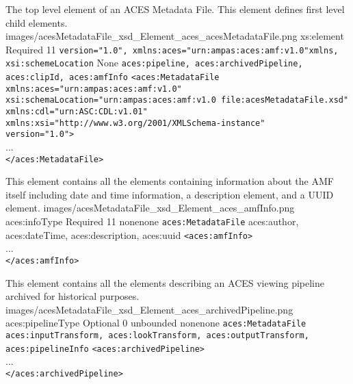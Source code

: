         {The top level element of an ACES Metadata File.  This element defines first level child elements.}
        {images/acesMetadataFile_xsd_Element_aces_acesMetadataFile.png}
        {xs:element}
        {Required}
        {1}{1}
        {\texttt{version="1.0", xmlns:aces="urn:ampas:aces:amf:v1.0"}}{\texttt{xmlns, xsi:schemeLocation}}
        {None}
        {\texttt{aces:pipeline, aces:archivedPipeline, aces:clipId, aces:amfInfo}}
        { \lstinline{<aces:MetadataFile} \\
        \lstinline{xmlns:aces="urn:ampas:aces:amf:v1.0"} \\
        \lstinline{xsi:schemaLocation="urn:ampas:aces:amf:v1.0 file:acesMetadataFile.xsd"} \\ \lstinline{xmlns:cdl="urn:ASC:CDL:v1.01"}\\
        \lstinline{xmlns:xsi="http://www.w3.org/2001/XMLSchema-instance"}\\
        \lstinline{version="1.0">}\\
        ... \\
        \lstinline{</aces:MetadataFile>}}

        {This element contains all the elements containing information about the AMF itself including date and time information, a description element, and a UUID element.}
        {images/acesMetadataFile_xsd_Element_aces_amfInfo.png}
        {aces:infoType}
        {Required}
        {1}{1}
        {none}{none}
        {\texttt{aces:MetadataFile}}
        {aces:author, aces:dateTime, aces:description, aces:uuid}
        {\lstinline{<aces:amfInfo>} \\
        ... \\
        \lstinline{</aces:amfInfo>}}

        {This element contains all the elements describing an ACES viewing pipeline archived for historical purposes.}
        {images/acesMetadataFile_xsd_Element_aces_archivedPipeline.png}
        {aces:pipelineType}
        {Optional}
        {0}
        {unbounded}
        {none}{none}
        {\texttt{aces:MetadataFile}}
        {\texttt{aces:inputTransform, aces:lookTransform, aces:outputTransform, \\ aces:pipelineInfo}}
        {\lstinline{<aces:archivedPipeline>} \\
        ... \\
        \lstinline{</aces:archivedPipeline>}}

